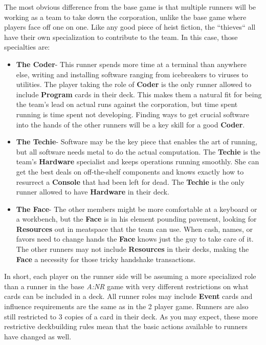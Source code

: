 \documentclass[titlepage]{article}
\begin{document}
The most obvious difference from the base game is that multiple runners will be working as a team to take down the corporation, unlike the base game where players face off one on one. Like any good piece of heist fiction, the ``thieves`` all have their own specialization to contribute to the team. In this case, those specialties are:
\begin{itemize}
	\item \textbf{The Coder}-
		This runner spends more time at a terminal than anywhere else, writing and installing software ranging from icebreakers to viruses to utilities. The player taking the role of \textbf{Coder} is the only runner allowed to include \textbf{Program} cards in their deck. This makes them a natural fit for being the team's lead on actual runs against the corporation, but time spent running is time spent not developing. Finding ways to get crucial software into the hands of the other runners will be a key skill for a good \textbf{Coder}.
	\item \textbf{The Techie}-
		Software may be the key piece that enables the art of running, but all software needs metal to do the actual computation. The \textbf{Techie} is the team's \textbf{Hardware} specialist and keeps operations running smoothly. She can get the best deals on off-the-shelf components and knows exactly how to resurrect a \textbf{Console} that had been left for dead. The \textbf{Techie} is the only runner allowed to have \textbf{Hardware} in their deck.
	\item \textbf{The Face}-
		The other members might be more comfortable at a keyboard or a workbench, but the \textbf{Face} is in his element pounding pavement, looking for \textbf{Resources} out in meatspace that the team can use. When cash, names, or favors need to change hands the \textbf{Face} knows just the guy to take care of it. The other runners may not include \textbf{Resources} in their decks, making the \textbf{Face} a necessity for those tricky handshake transactions.

\end{itemize}

In short, each player on the runner side will be assuming a more specialized role than a runner in the base \emph{A:NR} game with very different restrictions on what cards can be included in a deck. All runner roles may include \textbf{Event} cards and influence requirements are the same as in the 2 player game. Runners are also still restricted to 3 copies of a card in their deck. As you may expect, these more restrictive deckbuilding rules mean that the basic actions available to runners have changed as well.
\end{document}
